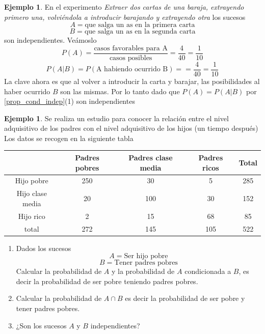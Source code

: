 \documentclass[]{book}
\theoremstyle{plain}
\theoremstyle{definition}
\newtheorem{example}[theorem]{Ejemplo}
\theoremstyle{definition} %
\begin{document}
\begin{example}
  En el experimento  \emph{Extraer dos cartas de una baraja, extrayendo primero una, volviéndola a introducir barajando y extrayendo otra} los sucesos 
  \[A = \text{que salga un as en la primera carta}\] 
  \[B = \text{que salga un as en la segunda carta}\] 
  son independientes. Veámoslo 
  \[P(A) = \frac{\text{casos favorables para A}}{\text{casos posibles}} = \frac{4}{40} = \frac{1}{10} \]
  \[P(A|B) = P(\text{A habiendo ocurrido B}) = = \frac{4}{40} = \frac{1}{10} \]
  La clave ahora es que al volver a introducir la carta y barajar, las posibilidades al haber ocurrido $B$ son las mismas.
  Por lo tanto dado que $P(A) = P(A|B)$ por \ref{prop_cond_indep}(1) son independientes
\end{example}

\begin{example}
  Se realiza un estudio para conocer la relación entre el nivel adquisitivo de los padres con el nivel adquisitivo de los hijos (un tiempo después)
  Los datos se recogen en la siguiente tabla

  \begin{center}
    \begin{tabular}{c|ccc|c}
                         &Padres pobres&Padres clase media&Padres ricos & Total \\
       \hline
       Hijo pobre        &250          &30                &5            &285     \\
       Hijo clase media  &20           &100               &30           &152     \\
       Hijo rico         &2            &15                &68           &85      \\
       \hline         
       total             &272          &145               &105          &522     \\
      \end{tabular}
  \end{center}

  \begin{enumerate}
    \item Dados los sucesos
    \[A=\text{Ser hijo pobre}\]
    \[B=\text{Tener padres pobres}\] 
    Calcular la probabilidad de $A$ y la probabilidad de $A$ condicionada a $B$, es decir la
     probabilidad de ser pobre teniendo padres pobres.
    \item Calcular la probabilidad de $A\cap B$ es decir la probabilidad de ser pobre y tener padres pobres.
    \item  ¿Son los sucesos $A$ y $B$ independientes?
  \end{enumerate}


\end{example}
\end{document}
